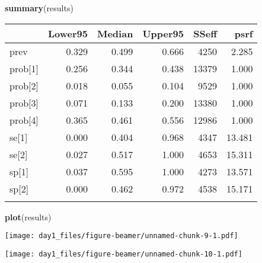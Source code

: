 \documentclass[
  ignorenonframetext,
]{beamer}
\newenvironment{Shaded}{\begin{snugshade}}{\end{snugshade}}
\newcommand{\FunctionTok}[1]{\textcolor[rgb]{0.13,0.29,0.53}{\textbf{#1}}}
\newcommand{\NormalTok}[1]{#1}
\begin{document}
\begin{frame}[fragile]
\scriptsize

\begin{Shaded}
\begin{Highlighting}[]
\FunctionTok{summary}\NormalTok{(results)}
\end{Highlighting}
\end{Shaded}

\normalsize

\scriptsize

\begin{longtable}[]{@{}lrrrrr@{}}
\toprule\noalign{}
& Lower95 & Median & Upper95 & SSeff & psrf \\
\midrule\noalign{}
\endhead
prev & 0.329 & 0.499 & 0.666 & 4250 & 2.285 \\
prob{[}1{]} & 0.256 & 0.344 & 0.438 & 13379 & 1.000 \\
prob{[}2{]} & 0.018 & 0.055 & 0.104 & 9529 & 1.000 \\
prob{[}3{]} & 0.071 & 0.133 & 0.200 & 13380 & 1.000 \\
prob{[}4{]} & 0.365 & 0.461 & 0.556 & 12986 & 1.000 \\
se{[}1{]} & 0.000 & 0.404 & 0.968 & 4347 & 13.481 \\
se{[}2{]} & 0.027 & 0.517 & 1.000 & 4653 & 15.311 \\
sp{[}1{]} & 0.037 & 0.595 & 1.000 & 4273 & 13.571 \\
sp{[}2{]} & 0.000 & 0.462 & 0.972 & 4538 & 15.171 \\
\bottomrule\noalign{}
\end{longtable}

\normalsize

\scriptsize

\begin{Shaded}
\begin{Highlighting}[]
\FunctionTok{plot}\NormalTok{(results)}
\end{Highlighting}
\end{Shaded}

\normalsize
\end{frame}

\begin{frame}
\scriptsize\texttt{[image: day1\_files/figure-beamer/unnamed-chunk-9-1.pdf]}
\normalsize
\end{frame}

\begin{frame}
\scriptsize\texttt{[image: day1\_files/figure-beamer/unnamed-chunk-10-1.pdf]}
\normalsize
\end{frame}
\end{document}
